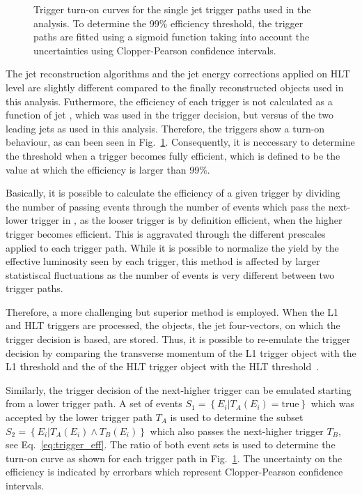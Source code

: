 \begin{figure}[htbp]
    \caption[Turn-on curves of single jet HLT trigger paths]{Trigger turn-on curves for the single jet trigger
    paths used in the analysis. To determine the 99\% efficiency threshold, the
    trigger paths are fitted using a sigmoid function taking into account the
    uncertainties using Clopper-Pearson confidence intervals.}
    \label{fig:trigger_eff}
\end{figure}

The jet reconstruction algorithms and the jet energy corrections applied on HLT
level are slightly different compared to the finally reconstructed objects used
in this analysis. Futhermore, the efficiency of each trigger is not calculated
as a function of jet \pt, which was used in the trigger decision, but versus
\ptavg of the two leading jets as used in this analysis. Therefore, the triggers
show a turn-on behaviour, as can been seen in Fig.~\ref{fig:trigger_eff}.
Consequently, it is neccessary to determine the threshold when a trigger becomes
fully efficient, which is defined to be the value at which the efficiency is
larger than 99\%.

Basically, it is possible to calculate the efficiency of a given trigger by
dividing the number of passing events through the number of events which pass
the next-lower trigger in \pt, as the looser trigger is by definition efficient,
when the higher trigger becomes efficient. This is aggravated through the
different prescales applied to each trigger path. While it is possible to
normalize the yield by the effective luminosity seen by each trigger, this
method is affected by larger statistiscal fluctuations as the number of events
is very different between two trigger paths.

Therefore, a more challenging but superior method is employed. When the L1
and HLT triggers are processed, the objects, \ie the jet four-vectors, on
which the trigger decision is based, are stored. Thus, it is possible to
re-emulate the trigger decision by comparing the transverse momentum of the L1
trigger object  with the L1 threshold and the \pt of the HLT trigger object with
the HLT threshold~\cite{Stober:2012abc}.

Similarly, the trigger decision of the next-higher trigger can be emulated
starting from a lower trigger path. A set of events $S_1 = \left\{E_i | T_A
(E_i) = \mathrm{true} \right\}$ which was accepted  by the lower trigger path $T_A$ is
used to determine the subset $S_2 = \left\{E_i|T_A(E_i) \wedge  T_B(E_i)
\right\}$ which also passes the next-higher trigger $T_B$, see
Eq.~\ref{eq:trigger_eff}. The ratio of both event sets is used to determine
the turn-on curve as shown for each trigger path in Fig.~\ref{fig:trigger_eff}. 
The uncertainty on the efficiency is
indicated by errorbars which represent Clopper-Pearson confidence intervals.

